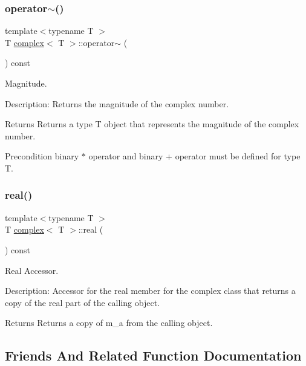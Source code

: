 \subsubsection{\texorpdfstring{operator$\sim$()}{operator~()}}
{\footnotesize\ttfamily template$<$typename T $>$ \\
T \hyperlink{classcomplex}{complex}$<$ T $>$\+::operator$\sim$ (\begin{DoxyParamCaption}{ }\end{DoxyParamCaption}) const}



Magnitude. 

Description\+: Returns the magnitude of the complex number. \begin{DoxyReturn}{Returns}
Returns a type T object that represents the magnitude of the complex number. 
\end{DoxyReturn}
\begin{DoxyPrecond}{Precondition}
binary $\ast$ operator and binary + operator must be defined for type T. 
\end{DoxyPrecond}
\mbox{\label{classcomplex_a9e88306cc536506d0370b7376e40287b}} 
\subsubsection{\texorpdfstring{real()}{real()}}
{\footnotesize\ttfamily template$<$typename T $>$ \\
T \hyperlink{classcomplex}{complex}$<$ T $>$\+::real (\begin{DoxyParamCaption}{ }\end{DoxyParamCaption}) const}



Real Accessor. 

Description\+: Accessor for the real member for the complex class that returns a copy of the real part of the calling object. \begin{DoxyReturn}{Returns}
Returns a copy of m\+\_\+a from the calling object. 
\end{DoxyReturn}


\subsection{Friends And Related Function Documentation}
\mbox{\label{classcomplex_a860d572e8b354fd76998c8c1309754f9}} 
